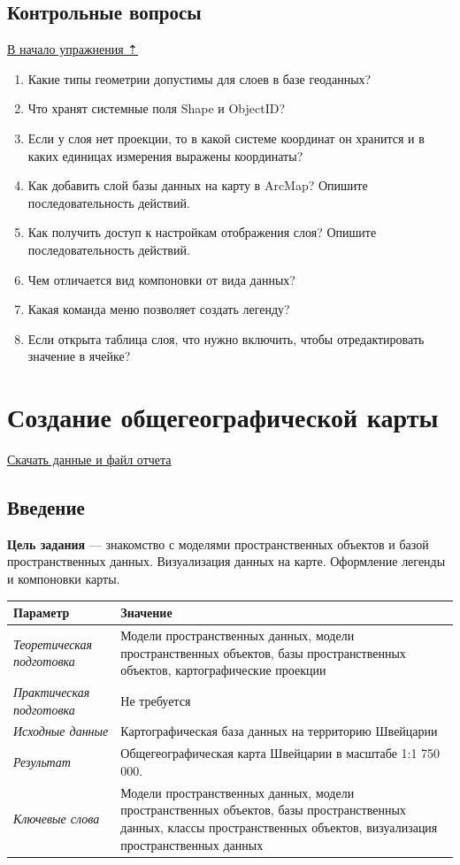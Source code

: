 \documentclass[]{book}
\theoremstyle{definition}
\theoremstyle{definition}
\theoremstyle{definition}
\theoremstyle{remark}
\begin{document}
\hypertarget{map-design-quaternary-questions}{%
\section{Контрольные вопросы}\label{map-design-quaternary-questions}}

\protect\hyperlink{map-design-quaternary}{В начало упражнения ⇡}

\begin{enumerate}
\def\labelenumi{\arabic{enumi}.}
\item
  Какие типы геометрии допустимы для слоев в базе геоданных?
\item
  Что хранят системные поля Shape и ObjectID?
\item
  Если у слоя нет проекции, то в какой системе координат он хранится и в
  каких единицах измерения выражены координаты?
\item
  Как добавить слой базы данных на карту в ArcMap? Опишите
  последовательность действий.
\item
  Как получить доступ к настройкам отображения слоя? Опишите
  последовательность действий.
\item
  Чем отличается вид компоновки от вида данных?
\item
  Какая команда меню позволяет создать легенду?
\item
  Если открыта таблица слоя, что нужно включить, чтобы отредактировать
  значение в ячейке?
\end{enumerate}

\hypertarget{map-design-general}{%
\chapter{Создание общегеографической карты}\label{map-design-general}}

\href{http://autolab.geogr.msu.ru/gis/data/Ex02.zip}{Скачать данные и
файл отчета}

\hypertarget{map-design-general-intro}{%
\section{Введение}\label{map-design-general-intro}}

\textbf{Цель задания} --- знакомство с моделями пространственных
объектов и базой пространственных данных. Визуализация данных на карте.
Оформление легенды и компоновки карты.

\begin{longtable}[]{@{}ll@{}}
\toprule
Параметр & Значение\tabularnewline
\midrule
\endhead
\emph{Теоретическая подготовка} & Модели пространственных данных, модели
пространственных объектов, базы пространственных объектов,
картографические проекции\tabularnewline
\emph{Практическая подготовка} & Не требуется\tabularnewline
\emph{Исходные данные} & Картографическая база данных на территорию
Швейцарии\tabularnewline
\emph{Результат} & Общегеографическая карта Швейцарии в масштабе 1:1 750
000.\tabularnewline
\emph{Ключевые слова} & Модели пространственных данных, модели
пространственных объектов, базы пространственных данных, классы
пространственных объектов, визуализация пространственных
данных\tabularnewline
\bottomrule
\end{longtable}
\end{document}

